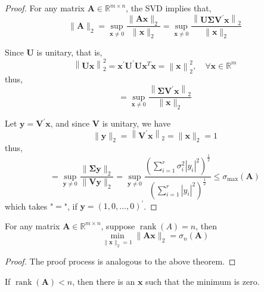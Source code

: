 \begin{proof}
	For any matrix $\mathbf{A}\in\mathbb{R}^{m\times n}$, the SVD implies that,
	\begin{equation*}
		\|\mathbf{A}\|_{2}=\sup_{\mathbf{x}\neq 0}\frac{\|\mathbf{A}\mathbf{x}\|_{2}}{\|\mathbf{x}\|_{2}}=\sup_{\mathbf{x}\neq 0}\frac{\left\|\mathbf{U}\boldsymbol{\Sigma}\mathbf{V}^{\prime}\mathbf{x}\right\|_{2}}{\|\mathbf{x}\|_{2}}
	\end{equation*}

	Since $\mathbf{U}$ is unitary, that is,
	\begin{equation*}
		\left\|\mathbf{U}\mathbf{x}\right\|_{2}^{2}=\mathbf{x}^{\prime}\mathbf{U}^{\prime}\mathbf{U}\mathbf{x}^{T}\mathbf{x}=\left\|\mathbf{x}\right\|_{2}^{2},\quad\forall\mathbf{x}\in\mathbb{R}^{m}
	\end{equation*}
	thus,
	\begin{equation*}
		=\sup_{\mathbf{x}\neq 0}\frac{\left\|\boldsymbol{\Sigma}\mathbf{V}^{\prime}\mathbf{x}\right\|_{2}}{\|\mathbf{x}\|_{2}}
	\end{equation*}

	Let $\mathbf{y}=\mathbf{V}^{\prime}\mathbf{x}$, and since $\mathbf{V}$ is unitary, we have
	\begin{equation*}
		\|\mathbf{y}\|_{2}=\left\|\mathbf{V}^{\prime}\mathbf{x}\right\|_{2}=\|\mathbf{x}\|_{2}=1
	\end{equation*}
	thus,
	\begin{equation*}
		=\sup_{\mathbf{y}\neq 0}\frac{\|\boldsymbol{\Sigma}\mathbf{y}\|_{2}}{\|\mathbf{V}\mathbf{y}\|_{2}}=\sup_{\mathbf{y}\neq 0}\frac{\left(\sum_{i=1}^{r}\sigma_{i}^{2}\left|y_{i}\right|^{2}\right)^{\frac{1}{2}}}{\left(\sum_{i=1}^{r}\left|y_{i}\right|^{2}\right)^{\frac{1}{2}}}\leq\sigma_{\max}(\mathbf{A})
	\end{equation*}
	which takes "$=$", if $\boldsymbol{y}=\left(1,0,\ldots,0\right)^{\prime}$.
\end{proof}

\begin{theorem}
	For any matrix $\mathbf{A}\in\mathbb{R}^{m\times n}$, suppose $\operatorname{rank}(A)=n$, then
	\begin{equation}
		\min_{\|\mathbf{x}\|_{2}=1}\|\mathbf{A}\mathbf{x}\|_{2}=\sigma_{n}(\mathbf{A})
	\end{equation}
\end{theorem}

\begin{proof}
	The proof process is analogous to the above theorem.
\end{proof}

\begin{remark}
	If $\operatorname{rank}(\mathbf{A})<n$, then there is an $\mathbf{x}$ such that the minimum is zero.
\end{remark}
